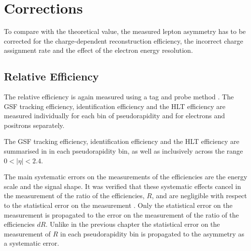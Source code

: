 \section{Corrections}
\label{sec:corrections2}

To compare with the theoretical value, the measured lepton asymmetry has to be
corrected for the charge-dependent reconstruction efficiency, the incorrect charge
assignment rate and the effect of the electron energy resolution.

\subsection{Relative Efficiency}
The relative efficiency is again measured using a tag and probe method \cite{adam2009tag}.
The {GSF} tracking efficiency,
identification efficiency and the {HLT} efficiency are measured individually
for each bin of pseudorapidity and for electrons and positrons separately. 

The {GSF} tracking efficiency, identification efficiency and the {HLT}
efficiency are summarised in 
in each pseudorapidity bin, as well as inclusively
across the range $0<| \eta |< 2.4$. 

The main systematic errors on the measurements of the efficiencies are the
energy scale and the signal shape. It was verified that these systematic effects
cancel in the measurement of the ratio of the efficiencies, $R$, and are
negligible with respect to the statistical error on the measurement
\cite{bendavid2011electron}.  Only the statistical error on the measurement is
propagated to the error on the measurement of the ratio of the efficiencies
$dR$.  Unlike in the previous chapter the statistical error on the measurement
of $R$ in each pseudorapidity bin is propagated to the asymmetry as a systematic
error. 

